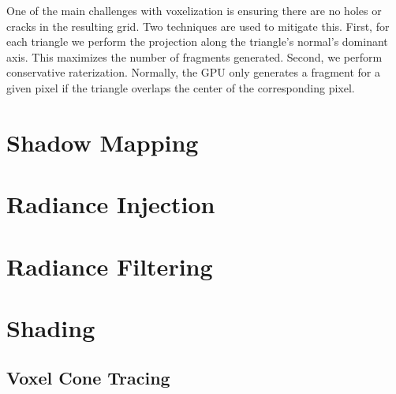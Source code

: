 One of the main challenges with voxelization is ensuring there are no holes or cracks in the resulting grid. Two techniques are used to mitigate this. First, for each triangle we perform the projection along the triangle's normal's dominant axis. This maximizes the number of fragments generated. Second, we perform conservative raterization. Normally, the GPU only generates a fragment for a given pixel if the triangle overlaps the center of the corresponding pixel. 


\section{Shadow Mapping}

\section{Radiance Injection}

\section{Radiance Filtering}

\section{Shading}

\subsection{Voxel Cone Tracing}